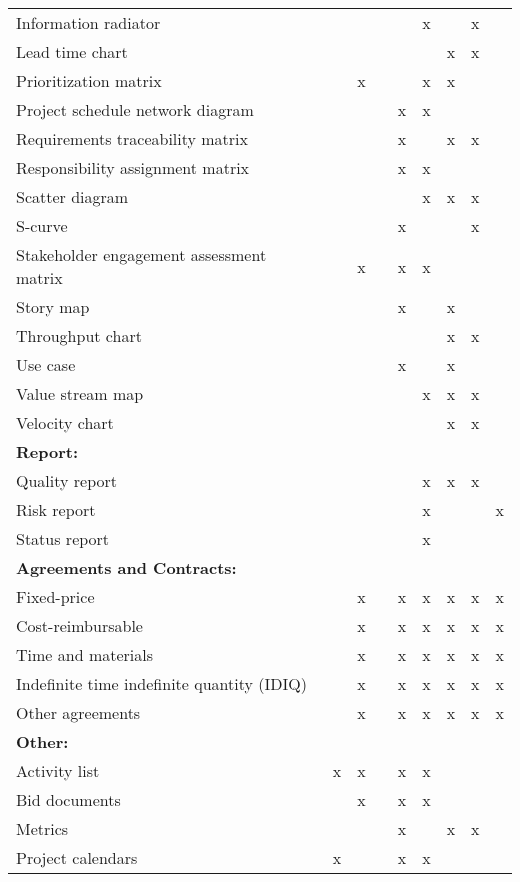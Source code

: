 \documentclass[11pt]{article}
\begin{document}
\begin{center}
\begin{tabular}{lllllllll}
Information radiator &  &  &  &  & x &  & x & \\
Lead time chart &  &  &  &  &  & x & x & \\
Prioritization matrix &  & x &  &  & x & x &  & \\
Project schedule network diagram &  &  &  & x & x &  &  & \\
Requirements traceability matrix &  &  &  & x &  & x & x & \\
Responsibility assignment matrix &  &  &  & x & x &  &  & \\
Scatter diagram &  &  &  &  & x & x & x & \\
S-curve &  &  &  & x &  &  & x & \\
Stakeholder engagement assessment matrix &  & x &  & x & x &  &  & \\
Story map &  &  &  & x &  & x &  & \\
Throughput chart &  &  &  &  &  & x & x & \\
Use case &  &  &  & x &  & x &  & \\
Value stream map &  &  &  &  & x & x & x & \\
Velocity chart &  &  &  &  &  & x & x & \\
\hline
\textbf{Report:} &  &  &  &  &  &  &  & \\
\hline
Quality report &  &  &  &  & x & x & x & \\
Risk report &  &  &  &  & x &  &  & x\\
Status report &  &  &  &  & x &  &  & \\
\hline
\textbf{Agreements and Contracts:} &  &  &  &  &  &  &  & \\
\hline
Fixed-price &  & x &  & x & x & x & x & x\\
Cost-reimbursable &  & x &  & x & x & x & x & x\\
Time and materials &  & x &  & x & x & x & x & x\\
Indefinite time indefinite quantity (IDIQ) &  & x &  & x & x & x & x & x\\
Other agreements &  & x &  & x & x & x & x & x\\
\hline
\textbf{Other:} &  &  &  &  &  &  &  & \\
\hline
Activity list & x & x &  & x & x &  &  & \\
Bid documents &  & x &  & x & x &  &  & \\
Metrics &  &  &  & x &  & x & x & \\
Project calendars & x &  &  & x & x &  &  & \\

\end{tabular}
\end{center}
\end{document}
